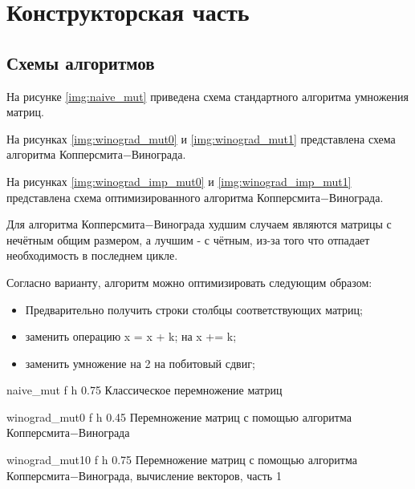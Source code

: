 \chapter{Конструкторская часть}

\section{Схемы алгоритмов}

На рисунке \ref{img:naive_mut} приведена схема стандартного алгоритма умножения матриц.

На рисунках \ref{img:winograd_mut0} и \ref{img:winograd_mut1} представлена схема алгоритма Копперсмита$-$Винограда.

На рисунках \ref{img:winograd_imp_mut0} и \ref{img:winograd_imp_mut1} представлена схема оптимизированного алгоритма Копперсмита$-$Винограда.

Для алгоритма Копперсмита$-$Винограда худшим случаем являются матрицы с нечётным общим размером, а лучшим - с чётным,
из-за того что отпадает необходимость в последнем цикле.

Согласно варианту, алгоритм можно оптимизировать следующим образом:
\begin{itemize}
    \item Предварительно получить строки столбцы соответствующих матриц;
    \item заменить операцию x = x + k; на x += k;
    \item заменить умножение на 2 на побитовый сдвиг;
\end{itemize}

{naive_mut} %
{f} %
{h} %
{0.75\textwidth} %
{Классическое перемножение матриц} %
\clearpage

{winograd_mut0} %
{f} %
{h} %
{0.45\textwidth} %
{Перемножение матриц с помощью алгоритма Копперсмита$-$Винограда} %
\clearpage

{winograd_mut10} %
{f} %
{h} %
{0.75\textwidth} %
{Перемножение матриц с помощью алгоритма Копперсмита$-$Винограда, вычисление векторов, часть 1} %
\clearpage

